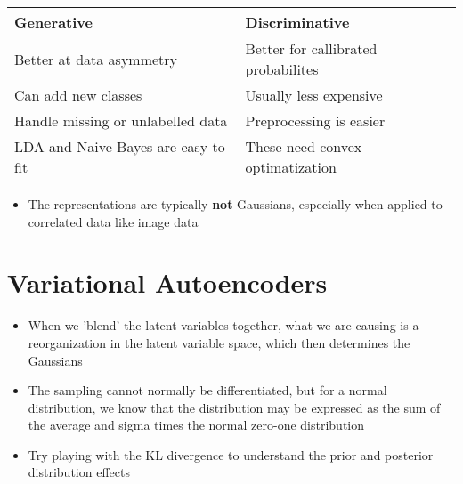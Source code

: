\documentclass[12pt,a4paper,oneside,headinclude]{scrartcl}
\numberwithin{figure}{section}
\numberwithin{equation}{section}
\numberwithin{table}{section}
\begin{document}
\begin{center}
\begin{tabular}{ll}
Generative & Discriminative\\
\hline
Better at data asymmetry & Better for callibrated probabilites\\
Can add new classes & Usually less expensive\\
Handle missing or unlabelled data & Preprocessing is easier\\
LDA and Naive Bayes are easy to fit & These need convex optimatization\\
\end{tabular}
\end{center}

\begin{itemize}
\item The representations are typically \textbf{not} Gaussians, especially when applied to
correlated data like image data
\end{itemize}
\section{Variational Autoencoders}
\label{sec:org1cbc582}
\begin{itemize}
\item When we 'blend' the latent variables together, what we are causing is a
reorganization in the latent variable space, which then determines the
Gaussians
\item The sampling cannot normally be differentiated, but for a normal distribution,
we know that the distribution may be expressed as the sum of the average and
sigma times the normal zero-one distribution
\item Try playing with the KL divergence to understand the prior and posterior
distribution effects
\end{itemize}
\end{document}
